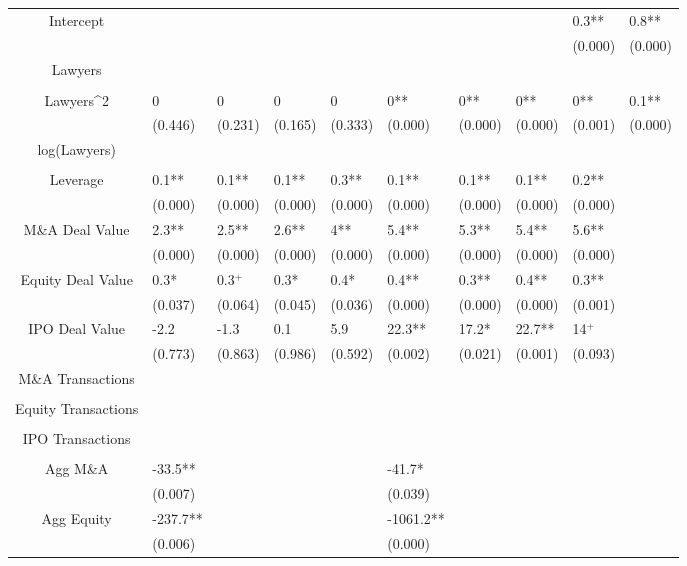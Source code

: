 \documentclass{article}
\begin{document}
\begin{table}[H]
\begin{tabular}{|clllllllll|}
Intercept &  &  &  &  &  &  &  & 0.3** & 0.8** \\ 
   &  &  &  &  &  &  &  & (0.000) & (0.000) \\ 
  Lawyers &  &  &  &  &  &  &  &  &  \\ 
   &  &  &  &  &  &  &  &  &  \\ 
  Lawyers^2 & 0 & 0 & 0 & 0 & 0** & 0** & 0** & 0** & 0.1** \\ 
   & (0.446) & (0.231) & (0.165) & (0.333) & (0.000) & (0.000) & (0.000) & (0.001) & (0.000) \\ 
  log(Lawyers) &  &  &  &  &  &  &  &  &  \\ 
   &  &  &  &  &  &  &  &  &  \\ 
  Leverage & 0.1** & 0.1** & 0.1** & 0.3** & 0.1** & 0.1** & 0.1** & 0.2** &  \\ 
   & (0.000) & (0.000) & (0.000) & (0.000) & (0.000) & (0.000) & (0.000) & (0.000) &  \\ 
  M\&A Deal Value & 2.3** & 2.5** & 2.6** & 4** & 5.4** & 5.3** & 5.4** & 5.6** &  \\ 
   & (0.000) & (0.000) & (0.000) & (0.000) & (0.000) & (0.000) & (0.000) & (0.000) &  \\ 
  Equity Deal Value & 0.3* & 0.3$^{+}$ & 0.3* & 0.4* & 0.4** & 0.3** & 0.4** & 0.3** &  \\ 
   & (0.037) & (0.064) & (0.045) & (0.036) & (0.000) & (0.000) & (0.000) & (0.001) &  \\ 
  IPO Deal Value & -2.2 & -1.3 & 0.1 & 5.9 & 22.3** & 17.2* & 22.7** & 14$^{+}$ &  \\ 
   & (0.773) & (0.863) & (0.986) & (0.592) & (0.002) & (0.021) & (0.001) & (0.093) &  \\ 
  M\&A Transactions &  &  &  &  &  &  &  &  &  \\ 
   &  &  &  &  &  &  &  &  &  \\ 
  Equity Transactions &  &  &  &  &  &  &  &  &  \\ 
   &  &  &  &  &  &  &  &  &  \\ 
  IPO Transactions &  &  &  &  &  &  &  &  &  \\ 
   &  &  &  &  &  &  &  &  &  \\ 
  Agg M\&A & -33.5** &  &  &  & -41.7* &  &  &  &  \\ 
   & (0.007) &  &  &  & (0.039) &  &  &  &  \\ 
  Agg Equity & -237.7** &  &  &  & -1061.2** &  &  &  &  \\ 
   & (0.006) &  &  &  & (0.000) &  &  &  &  \\ 

\end{tabular}
\end{table}
\end{document}
